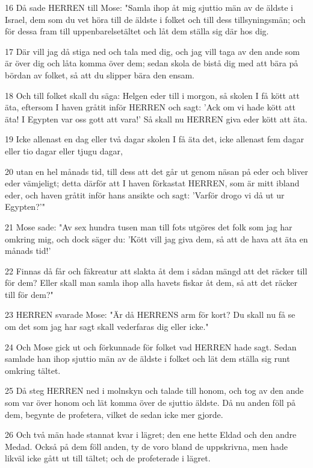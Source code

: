 \par 16 Då sade HERREN till Mose: "Samla ihop åt mig sjuttio män av de äldste i Israel, dem som du vet höra till de äldste i folket och till dess tillsyningsmän; och för dessa fram till uppenbarelsetältet och låt dem ställa sig där hos dig.
\par 17 Där vill jag då stiga ned och tala med dig, och jag vill taga av den ande som är över dig och låta komma över dem; sedan skola de bistå dig med att bära på bördan av folket, så att du slipper bära den ensam.
\par 18 Och till folket skall du säga: Helgen eder till i morgon, så skolen I få kött att äta, eftersom I haven gråtit inför HERREN och sagt: 'Ack om vi hade kött att äta! I Egypten var oss gott att vara!' Så skall nu HERREN giva eder kött att äta.
\par 19 Icke allenast en dag eller två dagar skolen I få äta det, icke allenast fem dagar eller tio dagar eller tjugu dagar,
\par 20 utan en hel månads tid, till dess att det går ut genom näsan på eder och bliver eder vämjeligt; detta därför att I haven förkastat HERREN, som är mitt ibland eder, och haven gråtit inför hans ansikte och sagt: 'Varför drogo vi då ut ur Egypten?'"
\par 21 Mose sade: "Av sex hundra tusen man till fots utgöres det folk som jag har omkring mig, och dock säger du: 'Kött vill jag giva dem, så att de hava att äta en månads tid!'
\par 22 Finnas då får och fäkreatur att slakta åt dem i sådan mängd att det räcker till för dem? Eller skall man samla ihop alla havets fiskar åt dem, så att det räcker till för dem?"
\par 23 HERREN svarade Mose: "Är då HERRENS arm för kort? Du skall nu få se om det som jag har sagt skall vederfaras dig eller icke."
\par 24 Och Mose gick ut och förkunnade för folket vad HERREN hade sagt. Sedan samlade han ihop sjuttio män av de äldste i folket och lät dem ställa sig runt omkring tältet.
\par 25 Då steg HERREN ned i molnskyn och talade till honom, och tog av den ande som var över honom och lät komma över de sjuttio äldste. Då nu anden föll på dem, begynte de profetera, vilket de sedan icke mer gjorde.
\par 26 Och två män hade stannat kvar i lägret; den ene hette Eldad och den andre Medad. Också på dem föll anden, ty de voro bland de uppskrivna, men hade likväl icke gått ut till tältet; och de profeterade i lägret.
